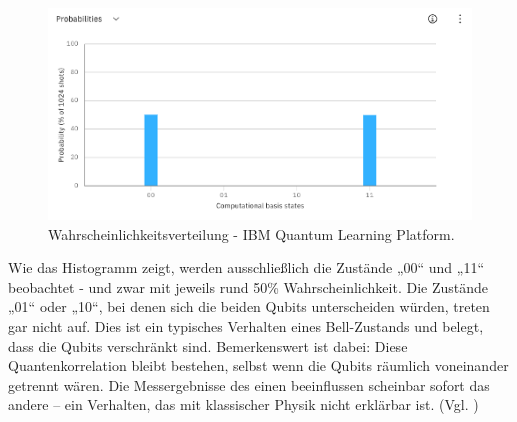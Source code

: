 \begin{figure}[ht]
    \centering
    \includegraphics[width=1\textwidth]{images/quantum-information/results_ibm.png}
    \caption{Wahrscheinlichkeitsverteilung - IBM Quantum Learning Platform.}
    \label{fig:meinbild}
\end{figure}


Wie das Histogramm zeigt, werden ausschließlich die Zustände „00“ und „11“ beobachtet - und zwar mit jeweils rund 50\% Wahrscheinlichkeit. Die Zustände „01“ oder „10“, bei denen sich die beiden Qubits unterscheiden würden, treten gar nicht auf. Dies ist ein typisches Verhalten eines Bell-Zustands und belegt, dass die Qubits verschränkt sind. Bemerkenswert ist dabei: Diese Quantenkorrelation bleibt bestehen, selbst wenn die Qubits räumlich voneinander getrennt wären. Die Messergebnisse des einen beeinflussen scheinbar sofort das andere – ein Verhalten, das mit klassischer Physik nicht erklärbar ist. (Vgl. \cite{Bell State ZZ-Measurement}) 


\printbibliography
